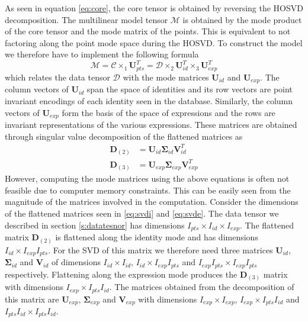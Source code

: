 \documentclass[11pt,a4paper,twoside]{report}
\begin{document}
As seen in equation \ref{eq:core}, the core tensor is obtained by reversing
the HOSVD decomposition. The multilinear model tensor $\mathcal{M}$ is obtained
by the mode product of the core tensor and the mode matrix of the points. This
is equivalent to not factoring along the point mode space during the HOSVD.
To construct the model we therefore have to implement the following formula
\begin{equation}\label{eq:model}
\mathcal{M} = \mathcal{C} \times_1 \mathbf{U}_{pts}^T = \mathcal{D} \times_2
\mathbf{U}_{id}^T \times_3 \mathbf{U}_{exp}^T
\end{equation}
which relates the data tensor $\mathcal{D}$ with the mode matrices $\mathbf{U}_{id}$
and $\mathbf{U}_{exp}$. The column vectors of $\mathbf{U}_{id}$ span the space
of identities and its row vectors are point invariant
encodings of each identity seen in the database. Similarly, the column
vectors of $\mathbf{U}_{exp}$ form the basis of the space of expressions and the
rows are invariant representations of the various expressions. These matrices
are obtained through singular value decomposition of the flattened
matrices as
\begin{align}\label{eq:svdi}
\mathbf{D}_{(2)} &= \mathbf{U}_{id} \mathbf{\Sigma}_{id} \mathbf{V}_{id}^T\\
\label{eq:svde}
\mathbf{D}_{(3)} &= \mathbf{U}_{exp} \mathbf{\Sigma}_{exp} \mathbf{V}_{exp}^T
\end{align}
However, computing the mode matrices using the above equations is often not
feasible due to computer memory constraints. This can be easily seen from the magnitude of the matrices
involved in the computation. Consider the dimensions of the flattened
matrices seen in \ref{eq:svdi} and \ref{eq:svde}. The data tensor we described
in section \ref{s:datatesnor} has
dimensions $I_{pts} \times I_{id} \times I_{exp}$. The flattened matrix
$\mathbf{D}_{(2)}$ is flattened along the identity mode and has dimensions
$I_{id} \times I_{exp}I_{pts}$. For the SVD of this matrix we therefore need
three matrices $\mathbf{U}_{id}$, $\mathbf{\Sigma}_{id}$ and $\mathbf{V}_{id}$
of dimensions $I_{id} \times I_{id}$, $I_{id} \times I_{exp}I_{pts}$ and
$I_{exp}I_{pts} \times I_{exp}I_{pts}$ respectively. Flattening along the expression mode produces
the $\mathbf{D}_{(3)}$ matrix with dimensions $I_{exp} \times
I_{pts}I_{id}$. The matrices obtained from the decomposition of this matrix are
$\mathbf{U}_{exp}$, $\mathbf{\Sigma}_{exp}$ and $\mathbf{V}_{exp}$ with
dimensions $I_{exp} \times I_{exp}$, $I_{exp} \times I_{pts}I_{id}$ and
$I_{pts}I_{id} \times I_{pts}I_{id}$.
\end{document}
